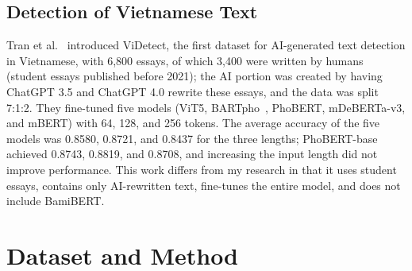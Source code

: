 \documentclass[conference,a4paper]{IEEEtran}
\begin{document}
\subsection{Detection of Vietnamese Text}
Tran et al.~\cite{videtect} introduced ViDetect, the first dataset for AI-generated text detection in Vietnamese, with 6,800 essays, of which 3,400 were written by humans (student essays published before 2021); the AI portion was created by having ChatGPT 3.5 and ChatGPT 4.0 rewrite these essays, and the data was split 7:1:2. They fine-tuned five models (ViT5, BARTpho~\cite{tran2022bartpho}, PhoBERT, mDeBERTa-v3, and mBERT) with 64, 128, and 256 tokens. The average accuracy of the five models was 0.8580, 0.8721, and 0.8437 for the three lengths; PhoBERT-base achieved 0.8743, 0.8819, and 0.8708, and increasing the input length did not improve performance. This work differs from my research in that it uses student essays, contains only AI-rewritten text, fine-tunes the entire model, and does not include BamiBERT.

\section{Dataset and Method}
\label{sec:method}
\end{document}
